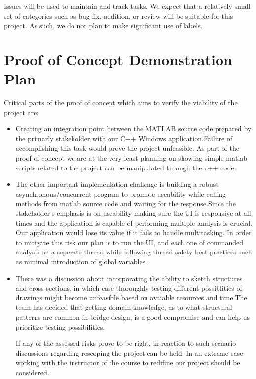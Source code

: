 \documentclass{article}
\begin{document}
Issues will be used to maintain and track tasks. We expect that a relatively small set of categories such as bug fix, addition, or review will be suitable for this project. As such, we do not plan to make significant use of labels.

\section{Proof of Concept Demonstration Plan}

Critical parts of the proof of concept which aims to verify the viability of the project are: \\
\begin{itemize}
\item Creating an integration point between the MATLAB source code prepared by the primarly stakeholder with our C++ Windows application.Failure of accomplishing this task would prove the project unfeasible. As part of the proof of concept we are at the very least planning on showing simple matlab scripts related to the project can be manipulated through the c++ code.
\item The other important implementation challenge is building a robust asynchronous/concurrent program to promote useability while calling methods from matlab source code and waiting for the response.Since the stakeholder's emphasis is on useability making sure the UI is responsive at all times and the application is capable of performing multiple analysis is crucial. Our application would lose its value if it fails to handle multitasking. In order to mitigate this risk our plan is to run the UI, and each one of commanded analysis on a seperate thread while following thread safety best practices such as minimal introduction of global variables.
\item There was a discussion about incorporating the ability to sketch structures and cross sections, in which case thoroughly testing different possiblities of drawings might become unfeasible based on avaiable resources and time.The team has decided that getting domain knowledge, as to what structural patterns are common in bridge design, is a good compromise and can help us prioritize testing possibilities.

If any of the assessed risks prove to be right, in reaction to such scenario discussions regarding rescoping the project can be held. In an extreme case working with the instructor of the course to redifine our project should be considered.
\end{itemize}
\end{document}
